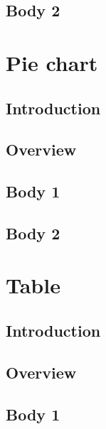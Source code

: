 \documentclass[11pt,a4paper]{article}
\begin{document}
\subsection*{Body 2}
\vspace{1cm}
\clearpage
\section*{Pie chart}
\subsection*{Introduction}
\vspace{1cm}
\subsection*{Overview}
\vspace{1cm}
\subsection*{Body 1}
\vspace{1cm}
\subsection*{Body 2}
\vspace{1cm}
\clearpage
\section*{Table}
\subsection*{Introduction}
\vspace{1cm}
\subsection*{Overview}
\vspace{1cm}
\subsection*{Body 1}
\vspace{1cm}
\end{document}
